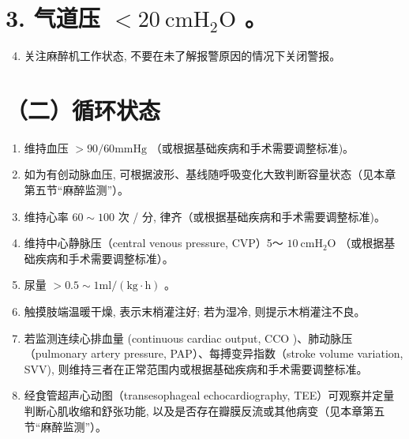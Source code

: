 \documentclass[10pt]{article}
\begin{document}
\section*{3. 气道压 $<20 \mathrm{~cm} \mathrm{H}_{2} \mathrm{O}$ 。}
\begin{enumerate}
  \setcounter{enumi}{3}
  \item 关注麻醉机工作状态, 不要在未了解报警原因的情况下关闭警报。
\end{enumerate}

\section*{（二）循环状态}
\begin{enumerate}
  \item 维持血压 $>90 / 60 \mathrm{mmHg}$ （或根据基础疾病和手术需要调整标准)。

  \item 如为有创动脉血压, 可根据波形、基线随呼吸变化大致判断容量状态（见本章第五节“麻醉监测”）。

  \item 维持心率 $60 \sim 100$ 次 / 分, 律齐（或根据基础疾病和手术需要调整标准)。

  \item 维持中心静脉压（central venous pressure, CVP）5～ $10 \mathrm{~cm} \mathrm{H}_{2} \mathrm{O}$ （或根据基础疾病和手术需要调整标准）。

  \item 尿量 $>0.5 \sim 1 \mathrm{ml} /(\mathrm{kg} \cdot \mathrm{h})$ 。

  \item 触摸肢端温暖干燥, 表示末梢灌注好; 若为湿冷, 则提示木梢灌注不良。

  \item 若监测连续心排血量 (continuous cardiac output, $\mathrm{CCO}$ )、肺动脉压（pulmonary artery pressure, PAP）、每搏变异指数（stroke volume variation, SVV), 则维持三者在正常范围内或根据基础疾病和手术需要调整标准。

  \item 经食管超声心动图（transesophageal echocardiography, TEE）可观察并定量判断心肌收缩和舒张功能, 以及是否存在瓣膜反流或其他病变（见本章第五节“麻醉监测”）。

\end{enumerate}
\end{document}
